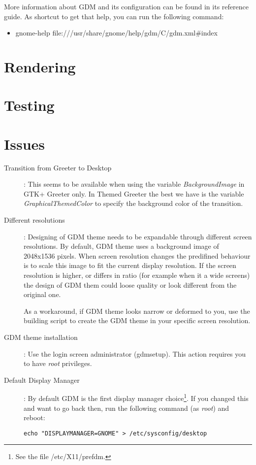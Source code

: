 \documentclass{article}
\begin{document}
More information about GDM and its configuration can be found in its
reference guide. As shortcut to get that help, you can run the
following command:

\begin{itemize}
\item gnome-help file:///usr/share/gnome/help/gdm/C/gdm.xml\#index
\end{itemize}

\section{Rendering}
\section{Testing}
\section{Issues}

\begin{description}

\item[Transition from Greeter to Desktop]: This seems to be available
when using the variable \emph{BackgroundImage} in GTK+ Greeter only.
In Themed Greeter the best we have is the variable
\emph{GraphicalThemedColor} to specify the background color of the
transition.

\item[Different resolutions]: Designing of GDM theme needs to be
expandable through different screen resolutions. By default, GDM theme
uses a background image of 2048x1536 pixels. When screen resolution
changes the predifined behaviour is to scale this image to fit the
current display resolution. If the screen resolution is higher, or
differs in ratio (for example when it a wide screens) the design of
GDM them could loose quality or look different from the original one.

As a workaround, if GDM theme looks narrow or deformed to you, use the
building script to create the GDM theme in your specific screen
resolution.

\item[GDM theme installation]: Use the login screen administrator
(gdmsetup). This action requires you to have \emph{root} privileges.

\item[Default Display Manager]: By default GDM is the first display
manager choice\footnote{See the file /etc/X11/prefdm.}. If you
changed this and want to go back then, run the following command (as
\emph{root}) and reboot:

\texttt{echo "DISPLAYMANAGER=GNOME" > /etc/sysconfig/desktop}

\end{description}


\end{document}
